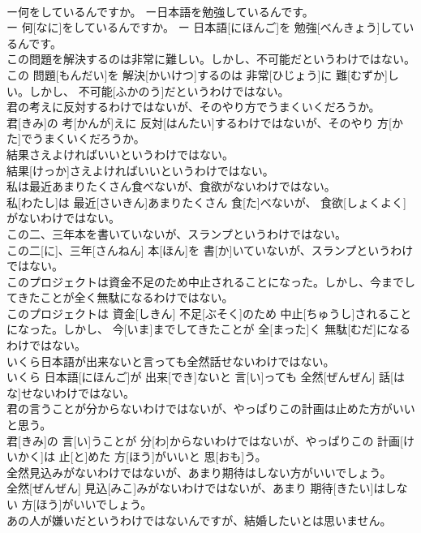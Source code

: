 \documentclass[8pt]{extreport}
\begin{document}
\begin{CJK}{UTF8}{min}
\\	ー何をしているんですか。 ー日本語を勉強しているんです。	
\\	ー 何[なに]をしているんですか。 ー 日本語[にほんご]を 勉強[べんきょう]しているんです。
\\	この問題を解決するのは非常に難しい。しかし、不可能だというわけではない。	
\\	この 問題[もんだい]を 解決[かいけつ]するのは 非常[ひじょう]に 難[むずか]しい。しかし、 不可能[ふかのう]だというわけではない。
\\	君の考えに反対するわけではないが、そのやり方でうまくいくだろうか。	
\\	君[きみ]の 考[かんが]えに 反対[はんたい]するわけではないが、そのやり 方[かた]でうまくいくだろうか。
\\	結果さえよければいいというわけではない。	
\\	結果[けっか]さえよければいいというわけではない。
\\	私は最近あまりたくさん食べないが、食欲がないわけではない。	
\\	私[わたし]は 最近[さいきん]あまりたくさん 食[た]べないが、 食欲[しょくよく]がないわけではない。
\\	この二、三年本を書いていないが、スランプというわけではない。	
\\	この二[に]、三年[さんねん] 本[ほん]を 書[か]いていないが、スランプというわけではない。
\\	このプロジェクトは資金不足のため中止されることになった。しかし、今までしてきたことが全く無駄になるわけではない。	
\\	このプロジェクトは 資金[しきん] 不足[ぶそく]のため 中止[ちゅうし]されることになった。しかし、 今[いま]までしてきたことが 全[まった]く 無駄[むだ]になるわけではない。
\\	いくら日本語が出来ないと言っても全然話せないわけではない。	
\\	いくら 日本語[にほんご]が 出来[でき]ないと 言[い]っても 全然[ぜんぜん] 話[はな]せないわけではない。
\\	君の言うことが分からないわけではないが、やっぱりこの計画は止めた方がいいと思う。	
\\	君[きみ]の 言[い]うことが 分[わ]からないわけではないが、やっぱりこの 計画[けいかく]は 止[と]めた 方[ほう]がいいと 思[おも]う。
\\	全然見込みがないわけではないが、あまり期待はしない方がいいでしょう。	
\\	全然[ぜんぜん] 見込[みこ]みがないわけではないが、あまり 期待[きたい]はしない 方[ほう]がいいでしょう。
\\	あの人が嫌いだというわけではないんですが、結婚したいとは思いません。	

\end{CJK}
\end{document}
